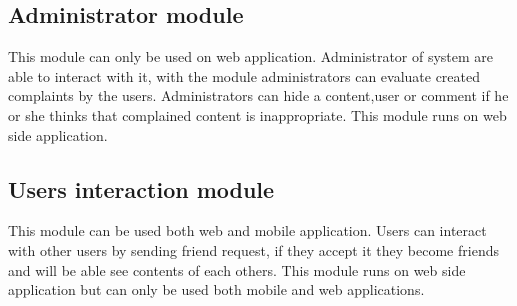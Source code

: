 \subsection{Administrator module}
This module can only be used on web application. Administrator of system are able to interact with it, with the module administrators can evaluate created complaints by the users. Administrators can hide a content,user or comment if he or she thinks that complained content is inappropriate. This module runs on web side application.

\subsection{Users interaction module}
This module can be used both web and mobile application. Users can interact with other users by sending friend request, if they accept it they become friends and will be able see contents of each others. This module runs on web side application but can only be used both mobile and web applications.

    
\newpage 
